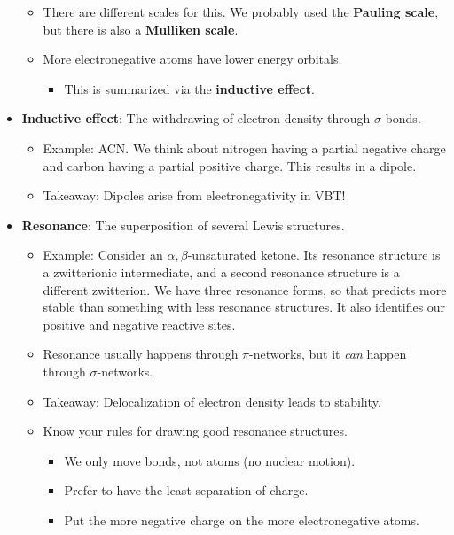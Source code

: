 \documentclass[../notes.tex]{subfiles}
\begin{document}
\begin{itemize}
\begin{itemize}
        \item There are different scales for this. We probably used the \textbf{Pauling scale}, but there is also a \textbf{Mulliken scale}.
        \item More electronegative atoms have lower energy orbitals.
        \begin{itemize}
            \item This is summarized via the \textbf{inductive effect}.
        \end{itemize}
    \end{itemize}
    \item \textbf{Inductive effect}: The withdrawing of electron density through $\sigma$-bonds.
    \begin{itemize}
        \item Example: ACN. We think about nitrogen having a partial negative charge and carbon having a partial positive charge. This results in a dipole.
        \item Takeaway: Dipoles arise from electronegativity in VBT!
    \end{itemize}
    \item \textbf{Resonance}: The superposition of several Lewis structures.
    \begin{itemize}
        \item Example: Consider an $\alpha,\beta$-unsaturated ketone. Its resonance structure is a zwitterionic intermediate, and a second resonance structure is a different zwitterion. We have three resonance forms, so that predicts more stable than something with less resonance structures. It also identifies our positive and negative reactive sites.
        \item Resonance usually happens through $\pi$-networks, but it \emph{can} happen through $\sigma$-networks.
        \item Takeaway: Delocalization of electron density leads to stability.
        \item Know your rules for drawing good resonance structures.
        \begin{itemize}
            \item We only move bonds, not atoms (no nuclear motion).
            \item Prefer to have the least separation of charge.
            \item Put the more negative charge on the more electronegative atoms.
        \end{itemize}
    \end{itemize}

\end{itemize}
\end{document}
